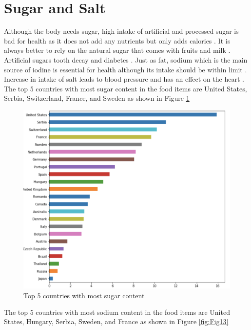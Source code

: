 \documentclass[sigconf]{acmart}
\begin{document}
\section{Sugar and Salt}
Although the body needs sugar, high intake of artificial and processed sugar is bad for health as it does not add any nutrients but only adds calories \cite{www-sugar}. It is always better to rely on the natural sugar that comes with fruits and milk \cite{www-sugar}. Artificial sugars tooth decay and diabetes \cite{www-sugar}. Just as fat, sodium which is the main source of iodine is essential for health although its intake should be within limit \cite{www-sugar}. Increase in intake of salt leads to blood pressure and has an effect on the heart \cite{www-sugar}. \\

The top 5 countries with most sugar content in the food items are United States, Serbia, Switzerland, France, and Sweden as shown in Figure \ref{fig:Fig12} \\
	
\begin{figure}
\includegraphics[width=1.0\columnwidth]{images/fig12.png}
\caption{Top 5 countries with most sugar content \cite{code-base}}
\label{fig:Fig12}
\end{figure} 

The top 5 countries with most sodium content in the food items are United States, Hungary, Serbia, Sweden, and France as shown in Figure \ref{fig:Fig13} \\
	
\end{document}
